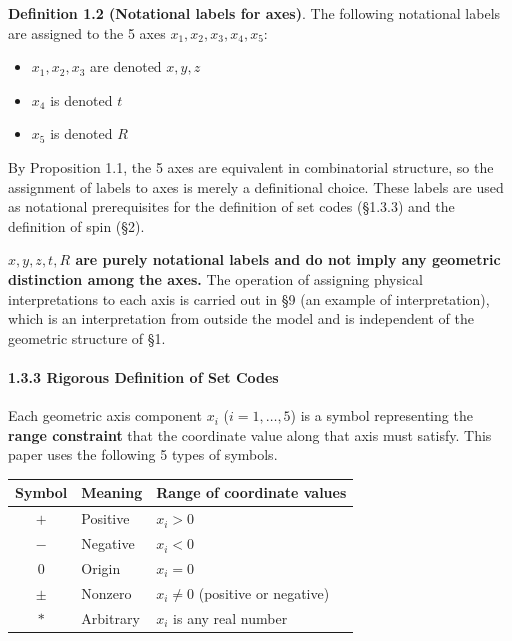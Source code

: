 \documentclass[
  a4paper,11pt]{article}
\newcounter{none}
\providecommand{\tightlist}{%
  \setlength{\itemsep}{0pt}\setlength{\parskip}{0pt}}
\theoremstyle{definition}
\theoremstyle{remark}
\begin{document}
\textbf{Definition 1.2 (Notational labels for axes)}. The following
notational labels are assigned to the 5 axes
\(x_1, x_2, x_3, x_4, x_5\):

\begin{itemize}
\tightlist
\item
  \(x_1, x_2, x_3\) are denoted \(x, y, z\)
\item
  \(x_4\) is denoted \(t\)
\item
  \(x_5\) is denoted \(R\)
\end{itemize}

By Proposition 1.1, the 5 axes are equivalent in combinatorial
structure, so the assignment of labels to axes is merely a definitional
choice. These labels are used as notational prerequisites for the
definition of set codes (§1.3.3) and the definition of spin (§2).

\textbf{\(x, y, z, t, R\) are purely notational labels and do not imply
any geometric distinction among the axes.} The operation of assigning
physical interpretations to each axis is carried out in §9 (an example
of interpretation), which is an interpretation from outside the model
and is independent of the geometric structure of §1.

\paragraph{1.3.3 Rigorous Definition of Set
Codes}\label{rigorous-definition-of-set-codes}

Each geometric axis component \(x_i\) (\(i = 1, \ldots, 5\)) is a symbol
representing the \textbf{range constraint} that the coordinate value
along that axis must satisfy. This paper uses the following 5 types of
symbols.

{\def\LTcaptype{none} %
\begin{longtable}[]{@{}cll@{}}
\toprule\noalign{}
Symbol & Meaning & Range of coordinate values \\
\midrule\noalign{}
\endhead
\bottomrule\noalign{}
\endlastfoot
\(+\) & Positive & \(x_i > 0\) \\
\(-\) & Negative & \(x_i < 0\) \\
\(0\) & Origin & \(x_i = 0\) \\
\(\pm\) & Nonzero & \(x_i \neq 0\) (positive or negative) \\
\(*\) & Arbitrary & \(x_i\) is any real number \\
\end{longtable}
}
\end{document}
